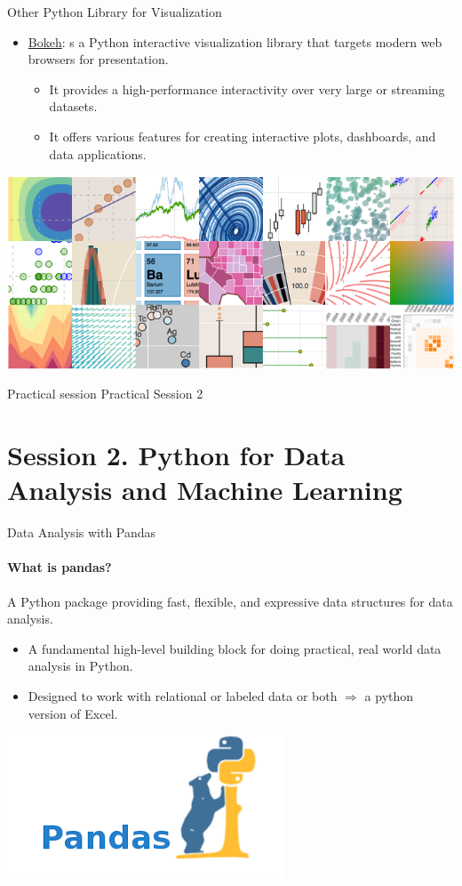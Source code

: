 \documentclass{bredelebeamer}
\begin{document}
\begin{frame}{Other Python Library for Visualization}

 \begin{itemize}
 	\item \href{http://bokeh.pydata.org/en/latest/}{Bokeh}: s a Python interactive visualization library that targets modern web browsers for presentation. 
    \begin{itemize}
 	\item It provides a high-performance interactivity over very large or streaming datasets.
 	\item It offers various features for  creating interactive plots, dashboards, and data applications.
    \end{itemize}
 \end{itemize}
 \centering
\includegraphics[scale=0.30]{../image/searborn.png}
\end{frame}

\begin{frame}{Practical session}
\centering
{\LARGE  Practical Session 2}
\end{frame}

\section{Session 2. Python for Data Analysis and Machine Learning}

\begin{frame}{Data Analysis with Pandas}
\framesubtitle{What is pandas?}
A Python package providing fast, flexible, and expressive data structures for data analysis.
\begin{itemize}
	\item A fundamental high-level building block for doing practical, real world data analysis in Python.
	\item Designed to work with relational or labeled data or both $\Rightarrow$ a python version of Excel.
\end{itemize}	
\centering
\includegraphics[scale=0.30]{../image/pandas.png}
\end{frame}
\end{document}
